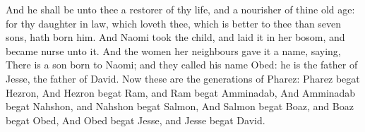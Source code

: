 \begin{biblechapter}
\verse And he shall be unto thee a restorer of thy life, and a nourisher of thine old age: for thy daughter in law, which loveth thee, which is better to thee than seven sons, hath born him.
\verse And Naomi took the child, and laid it in her bosom, and became nurse unto it.
\verse And the women her neighbours gave it a name, saying, There is a son born to Naomi; and they called his name Obed: he is the father of Jesse, the father of David.
 Now these are the generations of Pharez: Pharez begat Hezron,
\verse And Hezron begat Ram, and Ram begat Amminadab,
\verse And Amminadab begat Nahshon, and Nahshon begat Salmon,
\verse And Salmon begat Boaz, and Boaz begat Obed,
\verse And Obed begat Jesse, and Jesse begat David.
\end{biblechapter}
